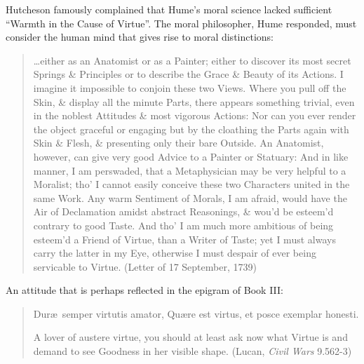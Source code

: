 Hutcheson famously complained that Hume’s moral science lacked sufficient ``Warmth in the Cause of Virtue''. The moral philosopher, Hume responded, must consider the human mind that gives rise to moral distinctions:
\begin{quote}
    \ldots either as an Anatomist or as a Painter; either to discover its most secret Springs \& Principles or to describe the Grace \& Beauty of its Actions. I imagine it impossible to conjoin these two Views. Where you pull off the Skin, \& display all the minute Parts, there appears something trivial, even in the noblest Attitudes \& most vigorous Actions: Nor can you ever render the object graceful or engaging but by the cloathing the Parts again with Skin \& Flesh, \& presenting only their bare Outside. An Anatomist, however, can give very good Advice to a Painter or Statuary: And in like manner, I am perswaded, that a Metaphysician may be very helpful to a Moralist; tho' I cannot easily conceive these two Characters united in the same Work. Any warm Sentiment of Morals, I am afraid, would have the Air of Declamation amidst abstract Reasonings, \& wou'd be esteem’d contrary to good Taste. And tho' I am much more ambitious of being esteem'd a Friend of Virtue, than a Writer of Taste; yet I must always carry the latter in my Eye, otherwise I must despair of ever being servicable to Virtue. (Letter of 17 September, 1739)
\end{quote}
An attitude that is perhaps reflected in the epigram of Book III:
\begin{quote}
    Dur\ae\ semper virtutis amator, Qu\ae re est virtus, et posce exemplar honesti.
    
    A lover of austere virtue, you should at least ask now what Virtue is and demand to see Goodness in her visible shape. (Lucan, \emph{Civil Wars} 9.562-3)
\end{quote}

\change

% 

